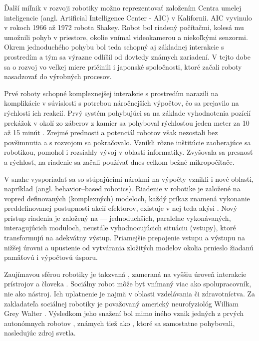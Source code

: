Ďalší míľnik v rozvoji robotiky možno reprezentovať založením Centra umelej inteligencie (angl. Artificial Intelligence Center - AIC) v Kalifornii. AIC vyvinulo v rokoch 1966 až 1972 robota Shakey. Robot bol riadený počítačmi, kolesá mu umožnili pohyb v priestore, okolie vnímal videokamerou a niekoľkými senzormi. Okrem jednoduchého pohybu bol teda schopný aj základnej interakcie s prostredím a tým sa výrazne odlíšil od dovtedy známych zariadení. V tejto dobe sa o rozvoj vo veľkej miere pričinili i japonské spoločnosti, ktoré začali roboty nasadzovať do výrobných procesov.

Prvé roboty schopné komplexnejšej interakcie s prostredím narazili na komplikácie v súvislosti s potrebou náročnejších výpočtov, čo sa prejavilo na rýchlosti ich reakcií. Prvý systém pohybujúci sa na základe vyhodnotenia pozícií prekážok v okolí zo záberov z kamier sa pohyboval rýchlosťou jeden meter za 10 až 15 minút \cite{RoboticsAndAutomationHandbook}. Zrejmé prednosti a potenciál robotov však nezostali bez povšimnutia a s rozvojom sa pokračovalo. Vznikli rôzne inštitúcie zaoberajúce sa robotikou, pomohol i rozsiahly vývoj v oblasti informatiky. Zvyšovala sa presnosť a rýchlosť, na riadenie sa začali používať dnes celkom bežné mikropočítače.

V snahe vysporiadať sa so stúpajúcimi nárokmi na výpočty vznikli i nové oblasti, napríklad  (angl. behavior--based robotics). Riadenie v  robotike je založené na vopred definovaných (komplexných) modeloch, každý príkaz znamená vykonanie preddefinovanej postupnosti akcií efektorov, existuje v nej teda akýsi  \cite{BehaviorBasedRobotics}. Nový prístup riadenia je založený na  --- jednoduchších, paralelne vykonávaných, interagujúcich moduloch, neustále vyhodnocujúcich situáciu (vstupy), ktoré transformujú na adekvátny výstup. Priamejšie prepojenie vstupu a výstupu na nižšej úrovni a upustenie od vytvárania zložitých modelov okolia prnieslo žiadanú pamäťovú i výpočtovú úsporu.

Zaujímavou sférou robotiky je takzvaná , zameraná na vyššiu úroveň interakcie prístrojov a človeka \cite{breazeal2016social}. Sociálny robot môže byť vnímaný viac ako spolupracovník, nie ako nástroj. Ich uplatnenie je najmä v oblasti vzdelávania či zdravotníctva. Za zakladateľa sociálnej robotiky je považovaný americký neurofyziológ William Grey Walter \cite{WalterTortoise}. Výsledkom jeho snažení bol mimo iného vznik jedných z prvých autonómnych robotov , známych tiež ako , ktoré sa samostatne pohybovali, nasledujúc zdroj svetla.


